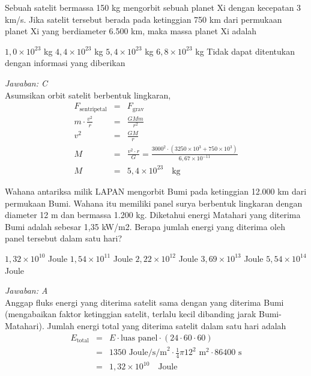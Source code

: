 \documentclass[11pt,fleqn, a4paper]{exam}
\begin{document}
\begin{questions}
\vspace{0.5cm}
\question Sebuah satelit bermassa 150 kg mengorbit sebuah planet Xi dengan kecepatan 3 km/s. Jika satelit tersebut berada pada ketinggian 750 km dari permukaan planet Xi yang berdiameter 6.500 km, maka massa planet Xi adalah
\begin{choices}
\choice $1,0 \times 10^{23}$ kg
\choice $4,4 \times 10^{23}$ kg
\choice $5,4 \times 10^{23}$ kg
\choice $6,8 \times 10^{23}$ kg
\choice Tidak dapat ditentukan dengan informasi yang diberikan
\end{choices}

\textit{Jawaban: C}\\
Asumsikan orbit satelit berbentuk lingkaran, 
\begin{eqnarray*}
F_{\text{sentripetal}} &=& F_{\text{grav}}\\
m \cdot \frac{v^2}{r} &=& \frac{GMm}{r^2}\\
v^2 &=& \frac{GM}{r}\\
M &=& \frac{v^2 \cdot r}{G} = \frac{3000^2 \cdot (3250 \times 10^3 + 750 \times 10^3)}{6,67 \times 10^{-11}}\\
M &=& 5,4 \times 10^{23} \quad \text{kg}
\end{eqnarray*}


\vspace{0.5cm}
\question Wahana antariksa milik LAPAN mengorbit Bumi pada ketinggian 12.000 km dari permukaan Bumi. Wahana itu memiliki panel surya berbentuk lingkaran dengan diameter 12 m dan bermassa 1.200 kg. Diketahui energi Matahari yang diterima Bumi adalah sebesar 1,35 kW/m2. Berapa jumlah energi yang diterima oleh panel tersebut dalam satu hari?
\begin{choices}
\choice $1,32 \times 10^{10}$ Joule
\choice $1,54 \times 10^{11}$ Joule
\choice $2,22 \times 10^{12}$ Joule
\choice $3,69 \times 10^{13}$ Joule
\choice $5,54 \times 10^{14}$ Joule
\end{choices}

\textit{Jawaban: A}\\
Anggap fluks energi yang diterima satelit sama dengan yang diterima Bumi (mengabaikan faktor ketinggian satelit, terlalu kecil dibanding jarak Bumi-Matahari). Jumlah energi total yang diterima satelit dalam satu hari adalah
\begin{eqnarray*}
E_{\text{total}} &=& E \cdot \text{luas panel} \cdot (24 \cdot 60 \cdot 60)\\
&=& 1350 \text{ Joule/s/m}^2 \cdot \frac{1}{4} \pi 12^2 \text{ m}^2 \cdot 86400 \text{ s}\\
&=& 1,32 \times 10^{10} \quad \text{Joule}
\end{eqnarray*}



\end{questions}
\end{document}
